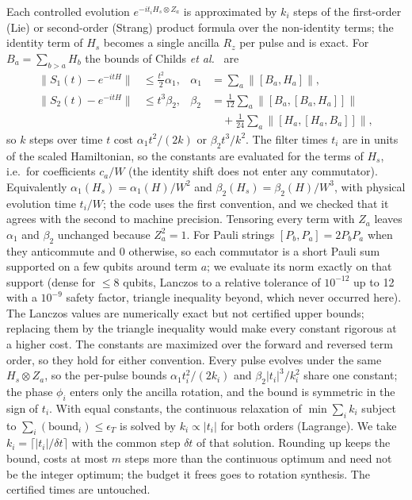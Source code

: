 \documentclass[aps,pra,twocolumn,superscriptaddress,nofootinbib]{revtex4-2}
\newcommand{\norm}[1]{\lVert#1\rVert}
\begin{document}
Each controlled evolution $e^{-it_iH_s\otimes Z_a}$ is approximated by $k_i$ steps of the first-order
(Lie) or second-order (Strang) product formula over the non-identity terms; the identity term of $H_s$
becomes a single ancilla $R_z$ per pulse and is exact. For $B_a=\sum_{b>a}H_b$ the bounds of Childs
\emph{et al.}~\cite[Props.~15--16]{Childs2021} are
\begin{align}
\norm{S_1(t)-e^{-itH}}&\le\tfrac{t^2}{2}\alpha_1,&\alpha_1&=\textstyle\sum_a\norm{[B_a,H_a]},\\
\norm{S_2(t)-e^{-itH}}&\le t^3\beta_2,&\beta_2&=\textstyle\frac1{12}\sum_a\norm{[B_a,[B_a,H_a]]}\nonumber\\
&&&\quad+\textstyle\frac1{24}\sum_a\norm{[H_a,[H_a,B_a]]},
\end{align}
so $k$ steps over time $t$ cost $\alpha_1t^2/(2k)$ or $\beta_2t^3/k^2$. The filter times $t_i$ are in
units of the scaled Hamiltonian, so the constants are evaluated for the terms of $H_s$, i.e.\ for
coefficients $c_a/W$ (the identity shift does not enter any commutator). Equivalently
$\alpha_1(H_s)=\alpha_1(H)/W^2$ and $\beta_2(H_s)=\beta_2(H)/W^3$, with physical evolution time
$t_i/W$; the code uses the first convention, and we checked that it agrees with the second to machine
precision. Tensoring every term with
$Z_a$ leaves $\alpha_1$ and $\beta_2$ unchanged because $Z_a^2=1$. For Pauli strings
$[P_b,P_a]=2P_bP_a$ when they anticommute and 0 otherwise, so each commutator is a short Pauli sum
supported on a few qubits around term $a$; we evaluate its norm exactly on that support (dense for
$\le8$ qubits, Lanczos to a relative tolerance of $10^{-12}$ up to 12 with a $10^{-9}$ safety factor,
triangle inequality beyond, which never occurred here). The Lanczos values are numerically exact but
not certified upper bounds; replacing them by the triangle inequality would make every constant
rigorous at a higher cost. The
constants are maximized over the forward and reversed term order, so they hold for either convention.
Every pulse evolves under the same $H_s\otimes Z_a$, so the per-pulse bounds
$\alpha_1t_i^2/(2k_i)$ and $\beta_2|t_i|^3/k_i^2$ share one constant; the phase $\phi_i$ enters only the
ancilla rotation, and the bound is symmetric in the sign of $t_i$. With equal constants, the continuous
relaxation of $\min\sum_ik_i$ subject to $\sum_i(\text{bound}_i)\le\epsilon_T$ is solved by
$k_i\propto|t_i|$ for both orders (Lagrange). We take $k_i=\lceil|t_i|/\delta t\rceil$ with the common
step $\delta t$ of that solution. Rounding up keeps the bound, costs at most $m$ steps more than the
continuous optimum and need not be the integer optimum; the budget it frees goes to rotation synthesis.
The certified times are untouched.
\end{document}
